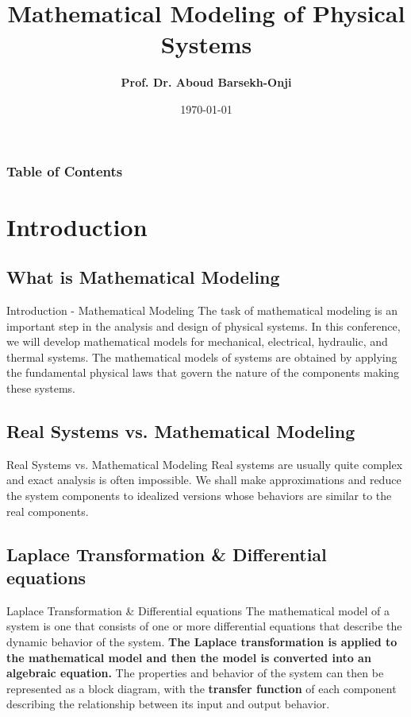 \documentclass{beamer}
\institute{\textbf{Universidad Anáhuac México, Facultad de Ingeniería}}
\title{\textbf {{Mathematical Modeling of Physical Systems}}}
\author{\textbf{Prof. Dr. Aboud Barsekh-Onji}}
\date \today
\begin{document}
\begin{frame}
    \titlepage
\end{frame}

\begin{frame}
    \frametitle{Table of Contents}
    \tableofcontents
\end{frame}

\section{Introduction}

\subsection{What is Mathematical Modeling}
\begin{frame}{Introduction - Mathematical Modeling}
    \justifying
    The task of mathematical modeling is an important step in the analysis and design of physical systems. In this conference, we will develop mathematical models for mechanical, electrical, hydraulic, and thermal systems. The mathematical models of systems are obtained by applying the fundamental physical laws that govern the nature of the components making these systems. 
\end{frame}

\subsection{Real Systems vs. Mathematical Modeling}
\begin{frame}{Real Systems vs. Mathematical Modeling}
    \justifying
    Real systems are usually quite complex and exact analysis is often impossible. We shall make approximations and reduce the system components to idealized versions whose behaviors are similar to the real components.
\end{frame}
\subsection{Laplace Transformation \& Differential equations}
\begin{frame}{Laplace Transformation \& Differential equations}
    \justifying
    The mathematical model of a system is one that consists of one or more differential equations that describe the dynamic behavior of the system. \textbf{The Laplace transformation is applied to the mathematical model and then the model is converted into an algebraic equation.} The properties and behavior of the system can then be represented as a block diagram, with the \textbf{transfer function} of each component describing the relationship between its input and output behavior. 
\end{frame}
\end{document}
